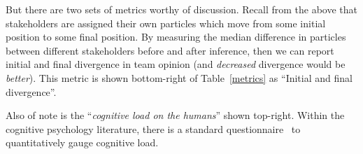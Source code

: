 But there are two sets of metrics worthy of discussion. Recall from the above that stakeholders are assigned their own particles which move from some initial
position to some final position. By measuring the median difference in particles between different
stakeholders before and after inference, then we can report initial and final divergence in team 
 opinion (and {\em decreased} divergence would be {\em better}). This metric is shown bottom-right of Table~\ref{metrics}
 as ``Initial and final divergence''.

 Also of note is the ``{\em cognitive load on the humans}'' shown top-right. Within the  cognitive psychology literature,
 there is a standard   questionnaire~\cite{CognitiveLoad} to quantitatively gauge cognitive load.


 




 

 





